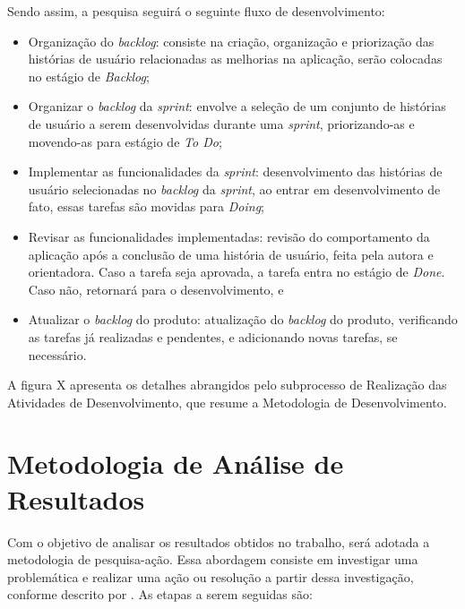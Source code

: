 Sendo assim, a pesquisa seguirá o seguinte fluxo de desenvolvimento:

\begin{itemize}
	\item Organização do \textit{backlog}: consiste na criação, organização e priorização das histórias de usuário relacionadas as melhorias na aplicação, serão colocadas no estágio de \textit{Backlog};
	\item Organizar o \textit{backlog} da \textit{sprint}: envolve a seleção de um conjunto de histórias de usuário a serem desenvolvidas durante uma \textit{sprint}, priorizando-as e movendo-as para estágio de \textit{To Do};
	\item Implementar as funcionalidades da \textit{sprint}: desenvolvimento das histórias de usuário selecionadas no \textit{backlog} da \textit{sprint}, ao entrar em desenvolvimento de fato, essas tarefas são movidas para \textit{Doing};
	\item Revisar as funcionalidades implementadas: revisão do comportamento da aplicação após a conclusão de uma história de usuário, feita pela autora e orientadora. Caso a tarefa seja aprovada, a tarefa entra no estágio de \textit{Done}. Caso não, retornará para o desenvolvimento, e
	\item Atualizar o \textit{backlog} do produto: atualização do \textit{backlog} do produto, verificando as tarefas já realizadas e pendentes, e adicionando novas tarefas, se necessário.
\end{itemize}

A figura X apresenta os detalhes abrangidos pelo subprocesso de Realização das Atividades de Desenvolvimento, que resume a Metodologia de Desenvolvimento.

\section{Metodologia de Análise de Resultados}
\label{sec:Metodologia de Analise de Resultados}
Com o objetivo de analisar os resultados obtidos no trabalho, será adotada a metodologia de pesquisa-ação. Essa abordagem consiste em investigar uma problemática e realizar uma ação ou resolução a partir dessa investigação, conforme descrito por . As etapas a 
serem seguidas são:

